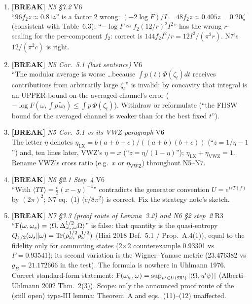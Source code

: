 \documentclass[11pt]{article}
\begin{document}
\begin{enumerate}[leftmargin=1.6em,itemsep=6pt]
\item \textbf{[BREAK]} \emph{N5 \S7.2} \hfill\textsc{V6}\\ ``\(96f_2z\approx0.81z\)'' is a factor 2 wrong: \((-2\log F)/I=48f_2z\approx0.405z=0.20\zeta\) (consistent with Table~6.3); ``\(-\log F\simeq f_2(12/r)^2I^2\)'' has the wrong \(r\)-scaling for the per-component \(f_2\): correct is \(144f_2I^2/r=12I^2/(\pi^2r)\). N7's \(12/(\pi^2c)\) is right.
\item \textbf{[BREAK]} \emph{N5 Cor.~5.1 (last sentence)} \hfill\textsc{V6}\\ ``The modular average is worse \dots because \(\int p(t)\Phi(\zeta_t)dt\) receives contributions from arbitrarily large \(\zeta_t\)'' is invalid: by concavity that integral is an UPPER bound on the averaged channel's error (\(-\log F(\omega,\int p\,\widetilde\omega_t)\le\int p\,\Phi(\zeta_t)\)). Withdraw or reformulate (``the FHSW bound for the averaged channel is weaker than for the best fixed \(t\)'').
\item \textbf{[BREAK]} \emph{N5 Cor.~5.1 vs its VWZ paragraph} \hfill\textsc{V6}\\ The letter \(\eta\) denotes \(\eta_{\mathrm{LX}}=b(a+b+c)/((a+b)(b+c))\) (``\(z=1/\eta-1\)'') and, ten lines later, VWZ's \(\eta=x\) (``\(z=\eta/(1-\eta)\)''); \(\eta_{\mathrm{LX}}+\eta_{\mathrm{VWZ}}=1\). Rename VWZ's cross ratio (e.g.\ \(x\) or \(\eta_{\mathrm{VWZ}}\)) throughout N5--N7.
\item \textbf{[BREAK]} \emph{N6 \S2.1 Step~4} \hfill\textsc{V6}\\ ``With \(\langle TT\rangle=\frac c2(x-y)^{-4}\)'' contradicts the generator convention \(U=e^{isT(f)}\) by \((2\pi)^2\); N7 eq.~(1) (\(c/8\pi^2\)) is correct. Fix the strategy note's sketch.
\item \textbf{[BREAK]} \emph{N7 \S3.3 (proof route of Lemma~3.2) and N6 \S2 step~2} \hfill\textsc{R3}\\ ``\(\operatorname{F}(\omega,\omega_s)=\langle\Omega,\Delta_{\omega_s,\omega}^{1/2}\Omega\rangle\)'' is false: that quantity is the quasi-entropy \(Q_{1/2}(\omega_s\Vert\omega)=\operatorname{Tr}(\rho_{\omega_s}^{1/2}\rho_\omega^{1/2})\) (Hiai 2018 Def.~5.1 / Prop.~A.4(1)), equal to the fidelity only for commuting states (2\(\times\)2 counterexample 0.93301 vs \(F=0.93541\)); its second variation is the Wigner--Yanase metric (23.476382 vs \(g_B=21.172666\) in the test). The formula is nowhere in Uhlmann 1976. Correct standard-form statement: \(\operatorname{F}(\omega_\psi,\omega)=\sup_{u'\in U(\mathfrak M')}|\langle\Omega,u'\psi\rangle|\) (Alberti--Uhlmann 2002 Thm.~2(3)). Scope: only the announced proof route of the (still open) type-III lemma; Theorem~A and eqs.\ (11)--(12) unaffected.

\end{enumerate}
\end{document}
